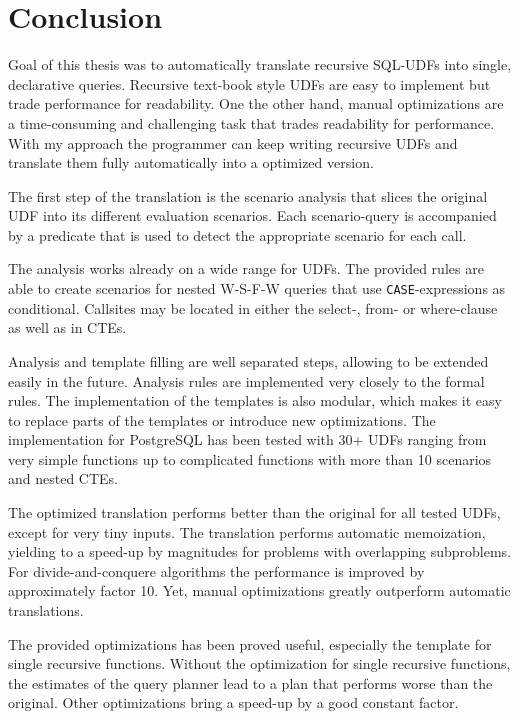 \chapter{Conclusion} \label{conclusion}



Goal of this thesis was to automatically translate recursive SQL-UDFs into single, declarative queries. Recursive text-book style UDFs are easy to implement but trade performance for readability. One the other hand, manual optimizations are a time-consuming and challenging task that trades readability for performance. With my approach the programmer can keep writing recursive UDFs and translate them fully automatically into a optimized version.

The first step of the translation is the scenario analysis that slices the original UDF into its different evaluation scenarios. Each scenario-query is accompanied by a predicate that is used to detect the appropriate scenario for each call.

The analysis works already on a wide range for UDFs. The provided rules are able to create scenarios for nested W-S-F-W queries that use \texttt{CASE}-expressions as conditional. Callsites may be located in either the select-, from- or where-clause as well as in CTEs.

Analysis and template filling are well separated steps, allowing to be extended easily in the future. Analysis rules are implemented very closely to the formal rules. The implementation of the templates is also modular, which makes it easy to replace parts of the templates or introduce new optimizations. The implementation for PostgreSQL has been tested with 30+ UDFs ranging from very simple functions up to complicated functions with more than 10 scenarios and nested CTEs.

The optimized translation performs better than the original for all tested UDFs, except for very tiny inputs. The translation performs automatic memoization, yielding to a speed-up by magnitudes for problems with overlapping subproblems. For divide-and-conquere algorithms the performance is improved by approximately factor 10. Yet, manual optimizations greatly outperform automatic translations.

The provided optimizations has been proved useful, especially the template for single recursive functions. Without the optimization for single recursive functions, the estimates of the query planner lead to a plan that performs worse than the original. Other optimizations bring a speed-up by a good constant factor.

